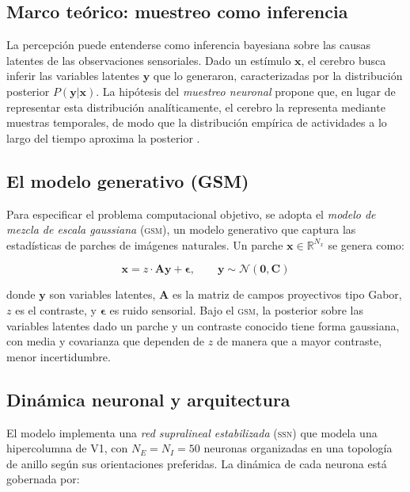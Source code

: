 \documentclass{llncs}
\begin{document}
\subsection{Marco teórico: muestreo como inferencia}

La percepción puede entenderse como inferencia bayesiana sobre las
causas latentes de las observaciones sensoriales. Dado un estímulo
$\mathbf{x}$, el cerebro busca inferir las variables latentes
$\mathbf{y}$ que lo generaron, caracterizadas por la distribución
posterior $P(\mathbf{y}|\mathbf{x})$. La hipótesis del \emph{muestreo
neuronal} propone que, en lugar de representar esta distribución
analíticamente, el cerebro la representa mediante muestras
temporales, de modo que la distribución empírica de actividades a lo
largo del tiempo aproxima la posterior \citep{echeveste2020cortical}.

\subsection{El modelo generativo (GSM)}

Para especificar el problema computacional objetivo, se adopta el
\emph{modelo de mezcla de escala gaussiana} (\textsc{gsm}), un modelo
generativo que captura las estadísticas de parches de imágenes
naturales. Un parche $\mathbf{x} \in \mathbb{R}^{N_x}$ se genera
como:

\begin{equation}
\mathbf{x} = z \cdot \mathbf{A}\mathbf{y} + \boldsymbol{\epsilon},
\qquad \mathbf{y} \sim \mathcal{N}(\mathbf{0}, \mathbf{C})
\label{eq:gsm}
\end{equation}

donde $\mathbf{y}$ son variables latentes, $\mathbf{A}$ es la matriz
de campos proyectivos tipo Gabor, $z$ es el contraste, y
$\boldsymbol{\epsilon}$ es ruido sensorial. Bajo el \textsc{gsm}, la
posterior sobre las variables latentes dado un parche y un contraste
conocido tiene forma gaussiana, con media y covarianza que dependen
de $z$ de manera que a mayor contraste, menor incertidumbre.

\subsection{Dinámica neuronal y arquitectura}

El modelo implementa una \emph{red supralineal estabilizada}
(\textsc{ssn}) que modela una hipercolumna de V1, con
$N_E = N_I = 50$ neuronas organizadas en una topología de anillo
según sus orientaciones preferidas. La dinámica de cada neurona está
gobernada por:
\end{document}
